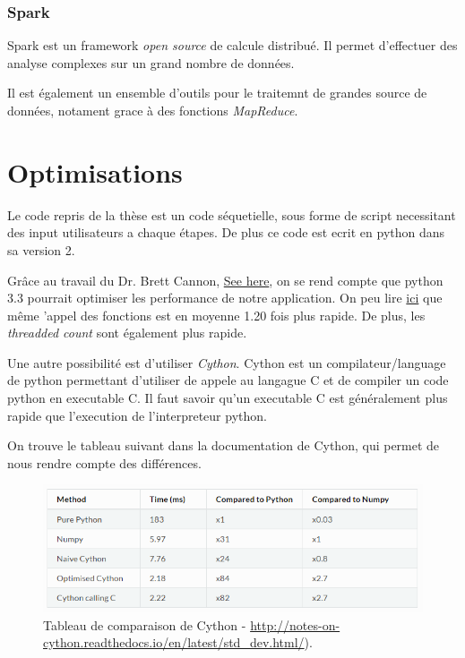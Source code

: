 \subsubsection{Spark}
Spark est un framework \emph{open source} de calcule distribué. Il permet d'effectuer des analyse complexes sur un grand nombre de données.

Il est également un ensemble d'outils pour le traitemnt de grandes source de données, notament grace à des fonctions \emph{MapReduce}.
	
\section{Optimisations}
Le code repris de la thèse \thLeite est un code séquetielle, sous forme de script necessitant des input utilisateurs a chaque étapes. De plus ce code est ecrit en python dans sa version 2.

Grâce au travail du Dr. Brett Cannon, \href{https://speakerdeck.com/pyconslides/python-3-dot-3-trust-me-its-better-than-python-2-dot-7-by-dr-brett-cannon}{See here}, on se rend compte que python 3.3 pourrait optimiser les performance de notre application. On peu lire 
\href{https://mail.python.org/pipermail/python-dev/2012-October/121923.html}{ici} que même 'appel des fonctions est en moyenne 1.20 fois plus rapide. De plus, les \emph{threadded count} sont également plus rapide.

Une autre possibilité est d'utiliser \emph{Cython}. Cython est un compilateur/language de python permettant d'utiliser de appele au langague C et de compiler un code python en executable C. Il faut savoir qu'un executable C est généralement plus rapide que l'execution de l'interpreteur python. 

On trouve le tableau suivant dans la documentation de Cython, qui permet de nous rendre compte des différences.

\begin{figure}[H] 
\centering 
\includegraphics[width=1\columnwidth]{img/table_cython} 
\caption[Tableau performences Cython]{Tableau de comparaison de Cython - \url{http://notes-on-cython.readthedocs.io/en/latest/std_dev.html/}).}
\label{fig:galleria} 
\end{figure}

